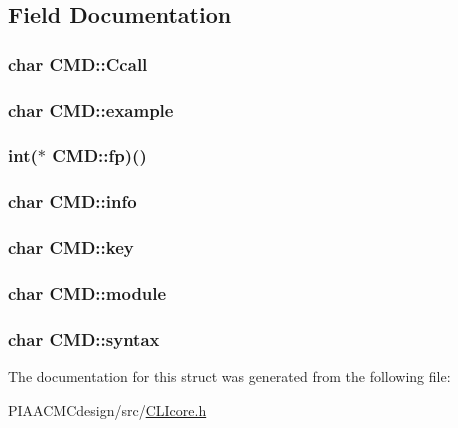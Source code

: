 \subsection{Field Documentation}
\hypertarget{structCMD_acc8ecba736894c2abe1da739bb1bb850}{
\subsubsection[{Ccall}]{\setlength{\rightskip}{0pt plus 5cm}char C\+M\+D\+::\+Ccall}}\label{structCMD_acc8ecba736894c2abe1da739bb1bb850}
\hypertarget{structCMD_a64cbd1d4ac5f0438bdab661e62d47f93}{
\subsubsection[{example}]{\setlength{\rightskip}{0pt plus 5cm}char C\+M\+D\+::example}}\label{structCMD_a64cbd1d4ac5f0438bdab661e62d47f93}
\hypertarget{structCMD_aedabad6607de51038f6355b9adfae55c}{
\subsubsection[{fp}]{\setlength{\rightskip}{0pt plus 5cm}int($\ast$ C\+M\+D\+::fp)()}}\label{structCMD_aedabad6607de51038f6355b9adfae55c}
\hypertarget{structCMD_aecf0315d4d31f9f0821c370532604a54}{
\subsubsection[{info}]{\setlength{\rightskip}{0pt plus 5cm}char C\+M\+D\+::info}}\label{structCMD_aecf0315d4d31f9f0821c370532604a54}
\hypertarget{structCMD_a208433b07e89cca90d13c52613fe897f}{
\subsubsection[{key}]{\setlength{\rightskip}{0pt plus 5cm}char C\+M\+D\+::key}}\label{structCMD_a208433b07e89cca90d13c52613fe897f}
\hypertarget{structCMD_af59d856e468e0d279c6b0e49db4f0cc5}{
\subsubsection[{module}]{\setlength{\rightskip}{0pt plus 5cm}char C\+M\+D\+::module}}\label{structCMD_af59d856e468e0d279c6b0e49db4f0cc5}
\hypertarget{structCMD_a3e3d8583f95573d025daacb98b25e8e6}{
\subsubsection[{syntax}]{\setlength{\rightskip}{0pt plus 5cm}char C\+M\+D\+::syntax}}\label{structCMD_a3e3d8583f95573d025daacb98b25e8e6}


The documentation for this struct was generated from the following file\+:\begin{DoxyCompactItemize}
\item 
P\+I\+A\+A\+C\+M\+Cdesign/src/\hyperlink{PIAACMCdesign_2src_2CLIcore_8h}{C\+L\+Icore.\+h}\end{DoxyCompactItemize}
